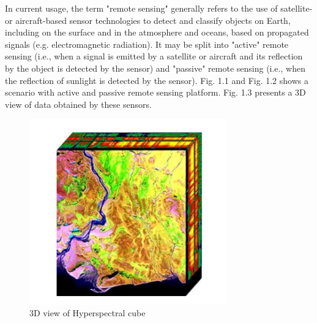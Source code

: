 \documentclass[document.tex]{subfiles}
\begin{document}
\noindent In current usage, the term "remote sensing" generally refers to the use of satellite- or aircraft-based sensor technologies to detect and classify objects on Earth, including on the surface and in the atmosphere and oceans, based on propagated signals (e.g. electromagnetic radiation). It may be split into "active" remote sensing (i.e., when a signal is emitted by a satellite or aircraft and its reflection by the object is detected by the sensor) and "passive" remote sensing (i.e., when the reflection of sunlight is detected by the sensor). Fig. 1.1 and Fig. 1.2 shows a scenario with active and passive remote sensing platform. Fig. 1.3 presents a 3D view of data obtained by these sensors.
\begin{figure}[H]
	\begin{center}
		\includegraphics[height=8.0cm]{imgs/cube.png}
	\end{center}
	\caption{3D view
		of Hyperspectral cube\cite{31}}
	\label{3D view 
		of Hyperspectral cube}
\end{figure}
\end{document}
